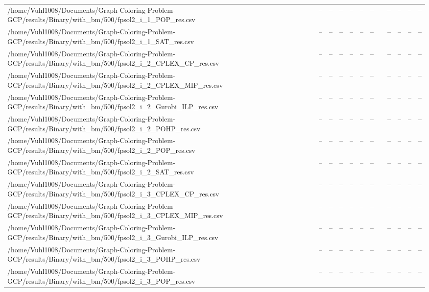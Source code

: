 \begin{table}[htbp]
\begin{tabular}{llllllllllll}
/home/Vuhl1008/Documents/Graph-Coloring-Problem-GCP/results/Binary/with\_bm/500/fpsol2\_i\_1\_POP\_res.csv & -- & -- & -- & -- & -- & -- & {} & -- & -- & -- & -- \\
/home/Vuhl1008/Documents/Graph-Coloring-Problem-GCP/results/Binary/with\_bm/500/fpsol2\_i\_1\_SAT\_res.csv & -- & -- & -- & -- & -- & -- & {} & -- & -- & -- & -- \\
/home/Vuhl1008/Documents/Graph-Coloring-Problem-GCP/results/Binary/with\_bm/500/fpsol2\_i\_2\_CPLEX\_CP\_res.csv & -- & -- & -- & -- & -- & -- & {} & -- & -- & -- & -- \\
/home/Vuhl1008/Documents/Graph-Coloring-Problem-GCP/results/Binary/with\_bm/500/fpsol2\_i\_2\_CPLEX\_MIP\_res.csv & -- & -- & -- & -- & -- & -- & {} & -- & -- & -- & -- \\
/home/Vuhl1008/Documents/Graph-Coloring-Problem-GCP/results/Binary/with\_bm/500/fpsol2\_i\_2\_Gurobi\_ILP\_res.csv & -- & -- & -- & -- & -- & -- & {} & -- & -- & -- & -- \\
/home/Vuhl1008/Documents/Graph-Coloring-Problem-GCP/results/Binary/with\_bm/500/fpsol2\_i\_2\_POHP\_res.csv & -- & -- & -- & -- & -- & -- & {} & -- & -- & -- & -- \\
/home/Vuhl1008/Documents/Graph-Coloring-Problem-GCP/results/Binary/with\_bm/500/fpsol2\_i\_2\_POP\_res.csv & -- & -- & -- & -- & -- & -- & {} & -- & -- & -- & -- \\
/home/Vuhl1008/Documents/Graph-Coloring-Problem-GCP/results/Binary/with\_bm/500/fpsol2\_i\_2\_SAT\_res.csv & -- & -- & -- & -- & -- & -- & {} & -- & -- & -- & -- \\
/home/Vuhl1008/Documents/Graph-Coloring-Problem-GCP/results/Binary/with\_bm/500/fpsol2\_i\_3\_CPLEX\_CP\_res.csv & -- & -- & -- & -- & -- & -- & {} & -- & -- & -- & -- \\
/home/Vuhl1008/Documents/Graph-Coloring-Problem-GCP/results/Binary/with\_bm/500/fpsol2\_i\_3\_CPLEX\_MIP\_res.csv & -- & -- & -- & -- & -- & -- & {} & -- & -- & -- & -- \\
/home/Vuhl1008/Documents/Graph-Coloring-Problem-GCP/results/Binary/with\_bm/500/fpsol2\_i\_3\_Gurobi\_ILP\_res.csv & -- & -- & -- & -- & -- & -- & {} & -- & -- & -- & -- \\
/home/Vuhl1008/Documents/Graph-Coloring-Problem-GCP/results/Binary/with\_bm/500/fpsol2\_i\_3\_POHP\_res.csv & -- & -- & -- & -- & -- & -- & {} & -- & -- & -- & -- \\
/home/Vuhl1008/Documents/Graph-Coloring-Problem-GCP/results/Binary/with\_bm/500/fpsol2\_i\_3\_POP\_res.csv & -- & -- & -- & -- & -- & -- & {} & -- & -- & -- & -- \\

\end{tabular}
\end{table}
